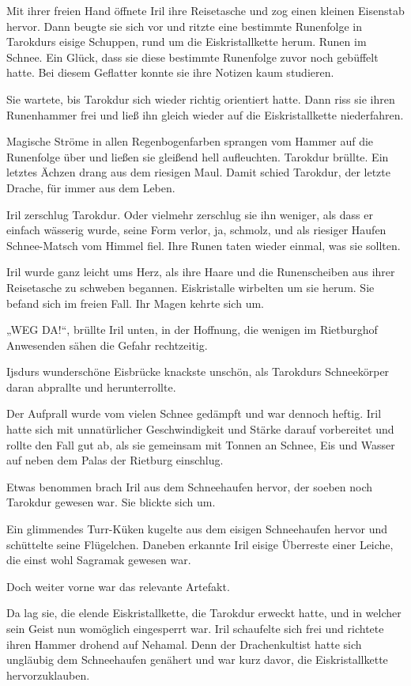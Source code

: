 Mit ihrer freien Hand öffnete Iril ihre Reisetasche und zog einen kleinen Eisenstab hervor. Dann beugte sie sich vor und ritzte eine bestimmte Runenfolge in Tarokdurs eisige Schuppen, rund um die Eiskristallkette herum. Runen im Schnee. Ein Glück, dass sie diese bestimmte Runenfolge zuvor noch gebüffelt hatte. Bei diesem Geflatter konnte sie ihre Notizen kaum studieren.

Sie wartete, bis Tarokdur sich wieder richtig orientiert hatte. Dann riss sie ihren Runenhammer frei und ließ ihn gleich wieder auf die Eiskristallkette niederfahren.

Magische Ströme in allen Regenbogenfarben sprangen vom Hammer auf die Runenfolge über und ließen sie gleißend hell aufleuchten. Tarokdur brüllte. Ein letztes Ächzen drang aus dem riesigen Maul. Damit schied Tarokdur, der letzte Drache, für immer aus dem Leben.

Iril zerschlug Tarokdur. Oder vielmehr zerschlug sie ihn weniger, als dass er einfach wässerig wurde, seine Form verlor, ja, schmolz, und als riesiger Haufen Schnee-Matsch vom Himmel fiel. Ihre Runen taten wieder einmal, was sie sollten.

Iril wurde ganz leicht ums Herz, als ihre Haare und die Runenscheiben aus ihrer Reisetasche zu schweben begannen. Eiskristalle wirbelten um sie herum. Sie befand sich im freien Fall. Ihr Magen kehrte sich um.

„WEG DA!“, brüllte Iril unten, in der Hoffnung, die wenigen im Rietburghof Anwesenden sähen die Gefahr rechtzeitig.

Ijsdurs wunderschöne Eisbrücke knackste unschön, als Tarokdurs Schneekörper daran abprallte und herunterrollte.

Der Aufprall wurde vom vielen Schnee gedämpft und war dennoch heftig. Iril hatte sich mit unnatürlicher Geschwindigkeit und Stärke darauf vorbereitet und rollte den Fall gut ab, als sie gemeinsam mit Tonnen an Schnee, Eis und Wasser auf neben dem Palas der Rietburg einschlug.

Etwas benommen brach Iril aus dem Schneehaufen hervor, der soeben noch Tarokdur gewesen war. Sie blickte sich um.

Ein glimmendes Turr-Küken kugelte aus dem eisigen Schneehaufen hervor und schüttelte seine Flügelchen. Daneben erkannte Iril eisige Überreste einer Leiche, die einst wohl Sagramak gewesen war.

Doch weiter vorne war das relevante Artefakt.

Da lag sie, die elende Eiskristallkette, die Tarokdur erweckt hatte, und in welcher sein Geist nun womöglich eingesperrt war. Iril schaufelte sich frei und richtete ihren Hammer drohend auf Nehamal. Denn der Drachenkultist hatte sich ungläubig dem Schneehaufen genähert und war kurz davor, die Eiskristallkette hervorzuklauben.

